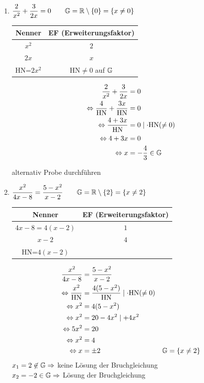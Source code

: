 
\clearpage
\Bsps
\begin{enumerate}
	\item $\dfrac{2}{x^2} + \dfrac{3}{2x} = 0\qquad\mathbb{G}=\mathbb{R}\setminus\{0\}=\{x\ne0\}$
	
	\begin{tabular}{c|c}
		Nenner & EF (Erweiterungsfaktor) \\
		\hline
		$x^2$ & $2$ \\
		$2x$ & $x$ \\
		\hline
		HN=$2x^2$ & HN$\ne0$ auf $\mathbb{G}$ \\
	\end{tabular}
	
	\begin{align*}
	\dfrac{2}{x^2} + \dfrac{3}{2x} &= 0\\
	\Leftrightarrow\dfrac{4}{\text{HN}} + \dfrac{3x}{\text{HN}} &= 0\\
	\Leftrightarrow\dfrac{4+3x}{\text{HN}} &= 0 \mid\cdot \text{HN}(\ne0)\\
	\Leftrightarrow4+3x &= 0\\
	\Leftrightarrow x &= -\dfrac{4}{3} \in\mathbb{G}\\
	\end{align*}
	
	alternativ {\flqq Probe\frqq} durchführen
	
	\clearpage
	\item\label{b2} $\dfrac{x^2}{4x-8} = \dfrac{5-x^2}{x-2}\qquad\mathbb{G}=\mathbb{R}\setminus\{2\}=\{x\ne2\}$
	
	\begin{tabular}{c|c}
		Nenner & EF (Erweiterungsfaktor) \\
		\hline
		$4x-8 = 4(x-2)$ & $1$ \\
		$x-2$ & $4$ \\
		\hline
		HN=$4(x-2)$ & \\
	\end{tabular}
	
	\begin{align*}
	\dfrac{x^2}{4x-8} &= \dfrac{5-x^2}{x-2}\\
	\Leftrightarrow\dfrac{x^2}{\text{HN}} &= \dfrac{4(5-x^2)}{\text{HN}}\mid\cdot \text{HN}(\ne0)\\
	\Leftrightarrow x^2 &= 4(5-x^2)\\
	\Leftrightarrow x^2 &= 20-4x^2\mid +4x^2\\
	\Leftrightarrow 5x^2 &= 20\\
	\Leftrightarrow x^2 &= 4\\
	\Leftrightarrow x &= \pm 2 & \mathbb{G}=\{x\ne2\}\\
	\end{align*}
	$x_1=2\not\in\mathbb{G}\Rightarrow$ keine Lösung der Bruchgleichung\\
	$x_2=-2\in\mathbb{G}\Rightarrow$ Lösung der Bruchgleichung
	

\end{enumerate}
